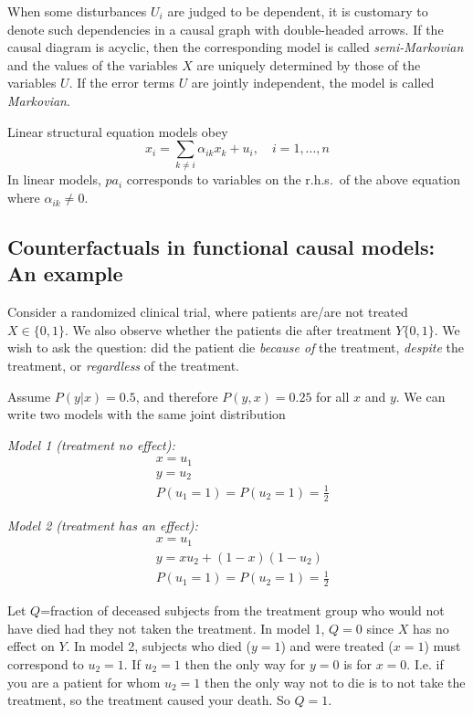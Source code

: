 \documentclass[11pt]{article}
\numberwithin{equation}{section}
\begin{document}
When some disturbances $U_i$ are judged to be dependent, it is customary to denote such dependencies in a causal graph with double-headed arrows. If the causal diagram is acyclic, then the corresponding model is called \textit{semi-Markovian} and the values of the variables $X$ are uniquely determined by those of the variables $U$. If the error terms $U$ are jointly independent, the model is called \textit{Markovian}.

Linear structural equation models obey
\begin{equation}
x_i = \sum_{k \neq i} \alpha_{ik} x_k + u_i, \quad i=1,...,n 
\end{equation}
In linear models, $pa_i$ corresponds to variables on the r.h.s.\ of the above equation where $\alpha_{ik} \neq 0$.

\subsection{Counterfactuals in functional causal models: An example} \label{sec:counterfactuals-example}
Consider a randomized clinical trial, where patients are/are not treated $X \in \{0,1\}$. We also observe whether the patients die after treatment $Y\{0,1\}$. We wish to ask the question: did the patient die \textit{because of} the treatment, \textit{despite} the treatment, or \textit{regardless} of the treatment.

Assume $P(y|x) = 0.5$, and therefore $P(y,x)=0.25$ for all $x$ and $y$. We can write two models with the same joint distribution

\textit{Model 1 (treatment no effect):}
\begin{align}
&x=u_1\\
&y=u_2\\
&P(u_1=1) = P(u_2=1)= \frac{1}{2}
\end{align}


\textit{Model 2 (treatment has an effect):}
\begin{align}
&x=u_1\\
&y=xu_2 + (1-x)(1-u_2)\\
&P(u_1=1) = P(u_2=1)= \frac{1}{2}
\end{align}

Let $Q$=fraction of deceased subjects from the treatment group who would not have died had they not taken the treatment. In model 1, $Q=0$ since $X$ has no effect on $Y$. In model 2, subjects who died ($y=1$) and were treated ($x=1$) must correspond to $u_2=1$. If $u_2=1$ then the only way for $y=0$ is for $x=0$. I.e. if you are a patient for whom $u_2=1$ then the only way not to die is to not take the treatment, so the treatment caused your death. So $Q=1$.
\end{document}
